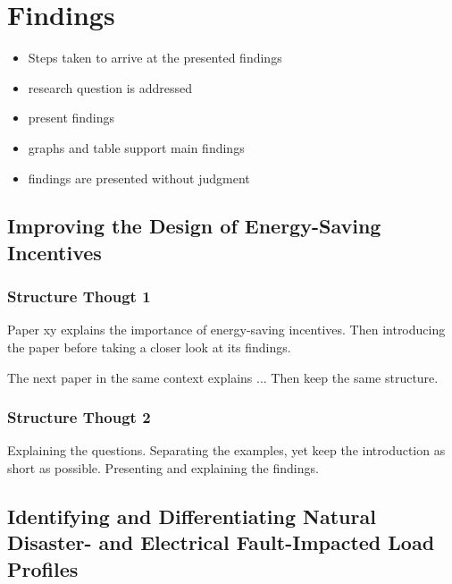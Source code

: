 \chapter{Findings}
\label{cha:findings}

\begin{itemize}
    \item Steps taken to arrive at the presented findings 
    \item research question is addressed
    \item present findings
    \item graphs and table support main findings 
    \item findings are presented without judgment
\end{itemize}

\section{Improving the Design of Energy-Saving Incentives}
\subsection*{Structure Thougt 1}
Paper xy explains the importance of energy-saving incentives.
Then introducing the paper before taking a closer look at its findings.

The next paper in the same context explains ...
Then keep the same structure.

\subsection*{Structure Thougt 2}
Explaining the questions.
Separating the examples, yet keep the introduction as short as possible.
Presenting and explaining the findings.

\section{Identifying and Differentiating Natural Disaster- and Electrical Fault-Impacted Load Profiles}
